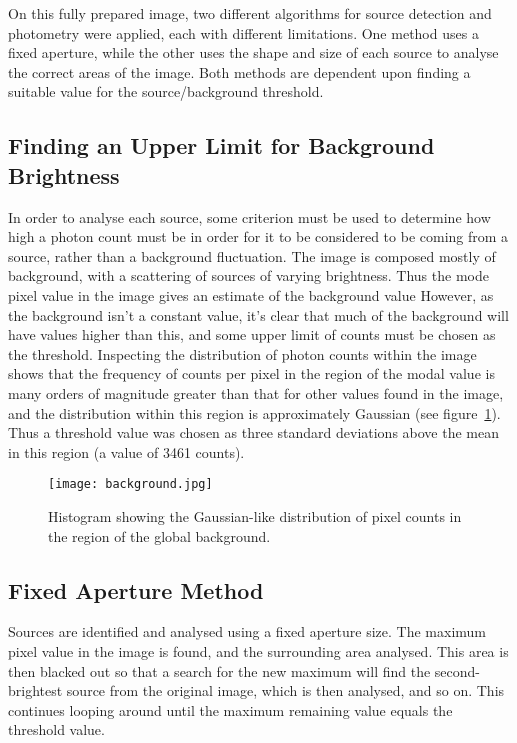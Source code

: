 \documentclass[a4paper,11pt,twoside]{article}
\begin{document}
On this fully prepared image, two different algorithms for source 
detection and photometry were applied, each with different limitations. 
One method uses a fixed aperture, while the other uses the shape and size of 
each  source to analyse the correct areas of the image. Both 
methods are dependent upon finding a suitable value for the 
source/background threshold. 

\subsection{Finding an Upper Limit for Background Brightness}
In order to analyse each source, some criterion must be used 
to determine how high a photon count must be in order for it to be 
considered to be coming from a source, rather than a background fluctuation.
The image is composed mostly of background, with a scattering of sources 
of varying brightness. Thus the mode pixel value in the 
image gives an estimate of the background value 
However, as the background isn't a constant value, it's clear that 
much of the background will have values higher than this, 
and some upper limit of counts must be chosen as the threshold.
Inspecting the distribution of photon counts within the image shows 
that the frequency of counts per pixel in the region of the modal 
value is many orders of magnitude greater than that for other 
values found in the image, and the distribution within this region 
is approximately Gaussian (see figure~\ref{fig:background}). Thus a 
threshold value was chosen as three standard deviations above the mean 
in this region (a value of 3461 counts).



\begin{figure}[htb]
  \centering
  \texttt{[image: background.jpg]}
  \caption{Histogram showing the Gaussian-like distribution of 
pixel counts in the region of the global background.} 
  \label{fig:background}
\end{figure}

\subsection{Fixed Aperture Method}

Sources are identified and analysed using a fixed aperture size. 
The maximum pixel value in the image is found, and the surrounding 
area analysed. This area is then blacked out so that a search for 
the new maximum will find the second-brightest source from the 
original image, which is then analysed, and so on. This continues 
looping around until the maximum remaining value equals the threshold value.
\end{document}
